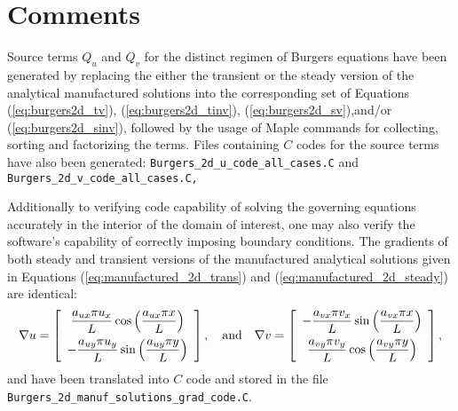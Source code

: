 \documentclass[10pt]{article}
\begin{document}
\section{Comments}

Source terms $Q_u$ and $Q_v$ for the distinct regimen of Burgers equations have been generated by replacing the either the transient or the steady version of the analytical  manufactured solutions into the corresponding set of Equations (\ref{eq:burgers2d_tv}), (\ref{eq:burgers2d_tinv}), (\ref{eq:burgers2d_sv}),and/or (\ref{eq:burgers2d_sinv}), followed by the usage of Maple \cite{Maple15} commands for collecting, sorting and factorizing the terms. Files containing $C$ codes for the source terms have also been generated:  \texttt{Burgers\_2d\_u\_code\_all\_cases.C} and \texttt{Burgers\_2d\_v\_code\_all\_cases.C,}

Additionally to verifying code capability of solving the governing equations accurately in the interior of the domain of interest, one may also verify the software's capability of correctly imposing boundary conditions. The gradients of both steady and transient versions of the manufactured analytical solutions given in Equations (\ref{eq:manufactured_2d_trans}) and (\ref{eq:manufactured_2d_steady}) are identical:
\begin{equation*}
\nabla u = \left[ \begin{array}{c}
  \dfrac{  a_{ux}  \pi u_x}{L} \cos\left( \dfrac{ a_{ux}  \pi  x}{L}\right)\vspace{5pt}\\
 -   \dfrac{  a_{uy}  \pi u_y}{L} \sin\left( \dfrac{ a_{uy}  \pi  y}{L}\right)
\end{array} \right],
\quad\mbox{and}\quad
\nabla  v= \left[ \begin{array}{c}
-  \dfrac{  a_{vx}  \pi v_x}{L}  \sin\left( \dfrac{ a_{vx}  \pi  x}{L}\right)\vspace{5pt}\\
    \dfrac{  a_{vy}  \pi v_y}{L} \cos\left( \dfrac{ a_{vy}  \pi  y}{L}\right)
\end{array} \right],
\end{equation*}
and have been translated into  $C$ code  and stored in the file \texttt{Burgers\_2d\_manuf\_solutions\_grad\_code.C}.
\end{document}
